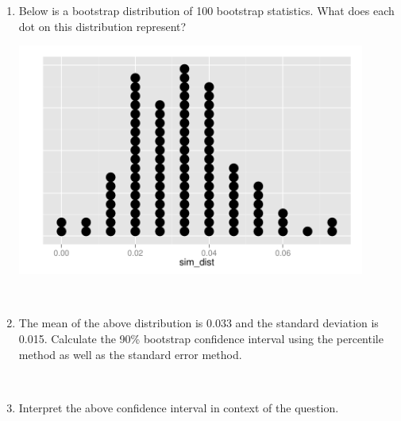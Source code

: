 \documentclass[11pt]{article}
\newcommand{\soln}[2]{$\:$\\ \vspace{#1}}{}
\begin{document}
\begin{enumerate}
\begin{enumerate}
\item Below is a bootstrap distribution of 100 bootstrap statistics. What does each dot on this distribution represent? 

\begin{minipage}[c]{0.4\textwidth}
\includegraphics[width=0.9\textwidth]{figures/diamond/cl_boot_dot.pdf} 
\end{minipage}
\begin{minipage}[c]{0.05\textwidth}
\end{minipage}
\begin{minipage}[c]{0.5\textwidth}
\soln{1cm}{Each dot represents a bootstrap proportion - proportion of internally flawless diamonds in a bootstrap sample of 150 from 
the original sample.}
\end{minipage}

\vfill


\pagebreak

\item The mean of the above distribution is 0.033 and the standard deviation is 0.015. Calculate the 90\% bootstrap 
confidence interval using the percentile method as well as the standard error method.

\soln{4cm}{
\textit{Percentile method:} The bounds of the confidence interval mark the middle 90\% of the bootstrap distribution. Since 
the distribution is comprised of 100 bootstrap proportions, we find the cutoff points that mark the lower and upper 5\% 
(5 points on each end) of the distribution: (0.013, 0.06). \\
\textit{Standard error method:} $0.033 \pm 1.66 * 0.015 =  (0.00825, 0.05775)$.
}

\item Interpret the above confidence interval in context of the question.


\end{enumerate}
\end{enumerate}
\end{document}
